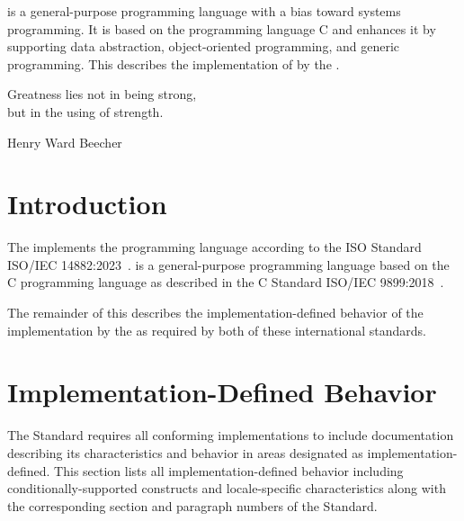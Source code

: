 




\renewcommand{\seecpp}{}

{\cpp{} is a general-purpose programming language with a bias toward systems programming.
It is based on the programming language C and enhances it by supporting data abstraction, object-oriented programming, and generic programming.
This \documentation{} describes the implementation of \cpp{} by the \ecs{}.}

\epigraph{Greatness lies not in being strong, \\ but in the using of strength.}{Henry Ward Beecher}

\section{Introduction}

The \ecs{} implements the \cpp{} programming language according to the ISO \cpp{} Standard ISO/IEC 14882:2023~\cite{iso2023}.
\cpp{} is a general-purpose programming language based on the C programming language as described in the C Standard ISO/IEC 9899:2018~\cite{iso2018}.

\begin{center}\cpplogo{2em}\end{center}

The remainder of this \documentation{} describes the implementation-defined behavior of the implementation by the \ecs{} as required by both of these international standards.

\section{Implementation-Defined Behavior}

The \cpp{} Standard requires all conforming implementations to include documentation describing its characteristics and behavior in areas designated as implementation-defined.
This section lists all implementation-defined behavior including conditionally-supported constructs and locale-specific characteristics along with the corresponding section and paragraph numbers of the \cpp{} Standard.

